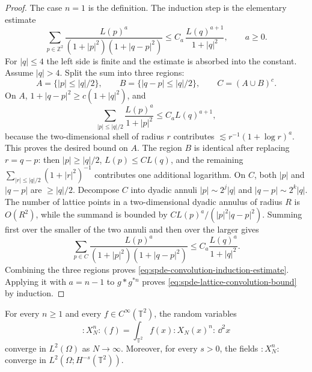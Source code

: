 \begin{proof}
The case \(n=1\) is the definition.  The induction step is the elementary
estimate
\begin{equation}
  \sum_{p\in\mathbb Z^2}
  \frac{L(p)^a}{(1+|p|^2)(1+|q-p|^2)}
  \leq
  C_a\,\frac{L(q)^{a+1}}{1+|q|^2},
  \qquad a\geq0 .
  \label{eq:spde-convolution-induction-estimate}
\end{equation}
For \(|q|\leq4\) the left side is finite and the estimate is absorbed into
the constant.  Assume \(|q|>4\).  Split the sum into three regions:
\[
  A=\{|p|\leq |q|/2\},\qquad
  B=\{|q-p|\leq |q|/2\},\qquad
  C=(A\cup B)^c .
\]
On \(A\), \(1+|q-p|^2\geq c(1+|q|^2)\), and
\[
  \sum_{|p|\leq |q|/2}\frac{L(p)^a}{1+|p|^2}
  \leq
  C_a L(q)^{a+1},
\]
because the two-dimensional shell of radius \(r\) contributes
\(\lesssim r^{-1}(1+\log r)^a\).  This proves the desired bound on \(A\).
The region \(B\) is identical after replacing \(r=q-p\): then
\(|p|\geq |q|/2\), \(L(p)\leq C L(q)\), and the remaining
\(\sum_{|r|\leq |q|/2}(1+|r|^2)^{-1}\) contributes one additional
logarithm.
On \(C\), both \(|p|\) and \(|q-p|\) are \(\geq |q|/2\).  Decompose \(C\)
into dyadic annuli \(|p|\sim 2^j|q|\) and
\(|q-p|\sim 2^k|q|\).  The number of lattice points in a two-dimensional
dyadic annulus of radius \(R\) is \(O(R^2)\), while the summand is bounded
by \(C L(p)^a/(|p|^2|q-p|^2)\).  Summing first over the smaller of the two
annuli and then over the larger gives
\[
  \sum_{p\in C}
  \frac{L(p)^a}{(1+|p|^2)(1+|q-p|^2)}
  \leq
  C_a\frac{L(q)^a}{1+|q|^2}.
\]
Combining the three regions proves
\eqref{eq:spde-convolution-induction-estimate}.  Applying it with
\(a=n-1\) to \(g*g^{*n}\) proves
\eqref{eq:spde-lattice-convolution-bound} by induction.
\end{proof}

\begin{proposition}
\label{prop:spde-two-dimensional-wick-powers}
For every \(n\geq1\) and every \(f\in C^\infty(\mathbb T^2)\), the random
variables
\[
  :\!X_N^n\!:(f)=\int_{\mathbb T^2}f(x):\!X_N(x)^n\!:\,\dd^2x
\]
converge in \(L^2(\Omega)\) as \(N\to\infty\).  Moreover, for every
\(s>0\), the fields \(:\!X_N^n\!:\) converge in
\(L^2(\Omega;H^{-s}(\mathbb T^2))\).
\end{proposition}

